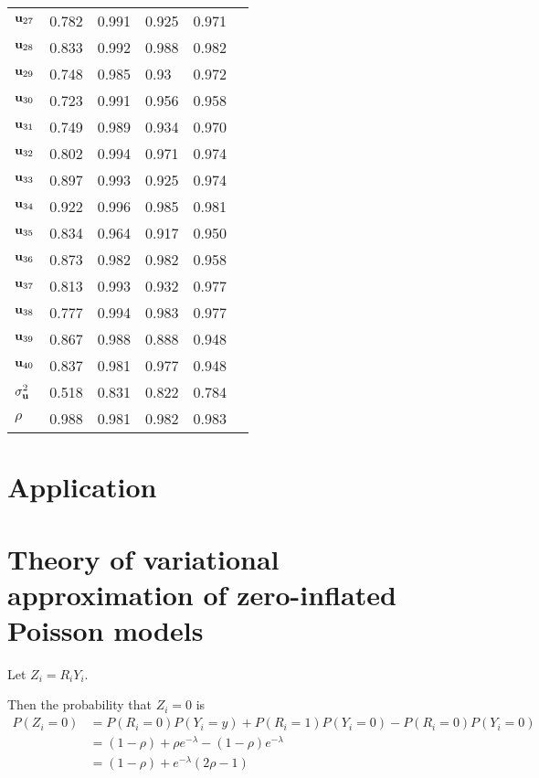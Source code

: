 \documentclass{article}[12pt]
\begin{document}
\begin{table}
\begin{tabular}{l|lllll}
${\bf u}_{27}$     &0.782&0.991&0.925&0.971\\
${\bf u}_{28}$     &0.833&0.992&0.988&0.982\\
${\bf u}_{29}$     &0.748&0.985&0.93&0.972\\
${\bf u}_{30}$     &0.723&0.991&0.956&0.958\\
${\bf u}_{31}$     &0.749&0.989&0.934&0.970\\
${\bf u}_{32}$     &0.802&0.994&0.971&0.974\\
${\bf u}_{33}$     &0.897&0.993&0.925&0.974\\
${\bf u}_{34}$     &0.922&0.996&0.985&0.981\\
${\bf u}_{35}$     &0.834&0.964&0.917&0.950\\
${\bf u}_{36}$     &0.873&0.982&0.982&0.958\\
${\bf u}_{37}$     &0.813&0.993&0.932&0.977\\
${\bf u}_{38}$     &0.777&0.994&0.983&0.977\\
${\bf u}_{39}$     &0.867&0.988&0.888&0.948\\
${\bf u}_{40}$     &0.837&0.981&0.977&0.948\\
$\sigma^2_{\bf u}$ &0.518&0.831&0.822&0.784\\
$\rho$ &0.988&0.981&0.982&0.983\\
\hline
\end{tabular}
\end{table}



\section{Application}\label{sec:application}

\section{Theory of variational approximation of zero-inflated Poisson models}
Let $Z_i = R_i Y_i$.

\noindent Then the probability that $Z_i = 0$ is
$$
\begin{array}{rl}
P(Z_i = 0) &= P(R_i = 0)P(Y_i = y) + P(R_i = 1) P(Y_i = 0) - P(R_i = 0) P(Y_i = 0) \\
&= (1 - \rho) + \rho e^{-\lambda} - (1 - \rho) e^{-\lambda} \\
&= (1 - \rho) + e^{-\lambda}(2 \rho - 1)
\end{array}
$$
\end{document}
